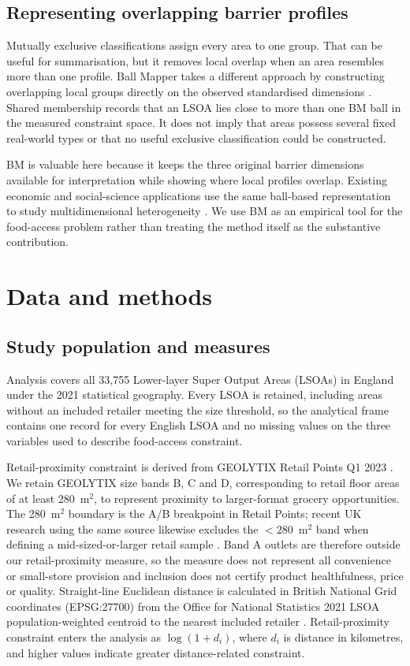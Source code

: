 \documentclass[11pt,a4paper]{article}
\begin{document}
\subsection{Representing overlapping barrier profiles}
Mutually exclusive classifications assign every area to one group. That can be useful for summarisation, but it removes local overlap when an area resembles more than one profile. Ball Mapper takes a different approach by constructing overlapping local groups directly on the observed standardised dimensions \citep{Dlotko2019}. Shared membership records that an LSOA lies close to more than one BM ball in the measured constraint space. It does not imply that areas possess several fixed real-world types or that no useful exclusive classification could be constructed.

BM is valuable here because it keeps the three original barrier dimensions available for interpretation while showing where local profiles overlap. Existing economic and social-science applications use the same ball-based representation to study multidimensional heterogeneity \citep{DlotkoQiuRudkin2024,RudkinEtAl2024}. We use BM as an empirical tool for the food-access problem rather than treating the method itself as the substantive contribution.

\section{Data and methods}
\subsection{Study population and measures}
Analysis covers all 33,755 Lower-layer Super Output Areas (LSOAs) in England under the 2021 statistical geography. Every LSOA is retained, including areas without an included retailer meeting the size threshold, so the analytical frame contains one record for every English LSOA and no missing values on the three variables used to describe food-access constraint.

Retail-proximity constraint is derived from GEOLYTIX Retail Points Q1 2023 \citep{Geolytix2023}. We retain GEOLYTIX size bands B, C and D, corresponding to retail floor areas of at least 280~m$^2$, to represent proximity to larger-format grocery opportunities. The 280~m$^2$ boundary is the A/B breakpoint in Retail Points; recent UK research using the same source likewise excludes the $<280$~m$^2$ band when defining a mid-sized-or-larger retail sample \citep{Jenneson2025}. Band A outlets are therefore outside our retail-proximity measure, so the measure does not represent all convenience or small-store provision and inclusion does not certify product healthfulness, price or quality. Straight-line Euclidean distance is calculated in British National Grid coordinates (EPSG:27700) from the Office for National Statistics 2021 LSOA population-weighted centroid to the nearest included retailer \citep{ONS2021PWC}. Retail-proximity constraint enters the analysis as $\log(1+d_i)$, where $d_i$ is distance in kilometres, and higher values indicate greater distance-related constraint.
\end{document}
